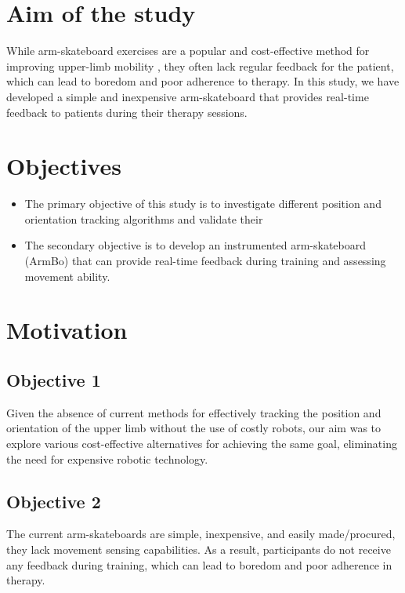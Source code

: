 \documentclass[12pt, twoside]{report}
\begin{document}
\newpage
\section{Aim of the study}

While arm-skateboard exercises are a popular and cost-effective method for 
improving upper-limb mobility \parencite{chanubol_randomized_2012,sanchez_automating_2006}, they often lack regular feedback for 
the patient, which can lead to boredom and poor adherence to therapy. 
In this study, we have developed a simple and inexpensive arm-skateboard 
that provides real-time feedback to patients during their therapy sessions.

\section{Objectives}

\begin{itemize}
    \item The primary objective of this study is to investigate different position and orientation tracking algorithms and validate their
    \item The secondary objective is to develop an instrumented arm-skateboard (ArmBo)
    that can provide real-time feedback during training and assessing movement ability.
\end{itemize}

\section{Motivation}
\subsection{Objective 1}
Given the absence of current methods for effectively tracking the 
position and orientation of the upper limb without the use of costly robots, 
our aim was to explore various cost-effective alternatives for achieving the 
same goal, eliminating the need for expensive robotic technology.\\

\subsection{Objective 2}
The current arm-skateboards are simple, inexpensive, and easily made/procured, they lack movement sensing capabilities.
As a result, participants do not receive any feedback during training, which can lead to boredom and poor adherence in therapy.\\
\end{document}
